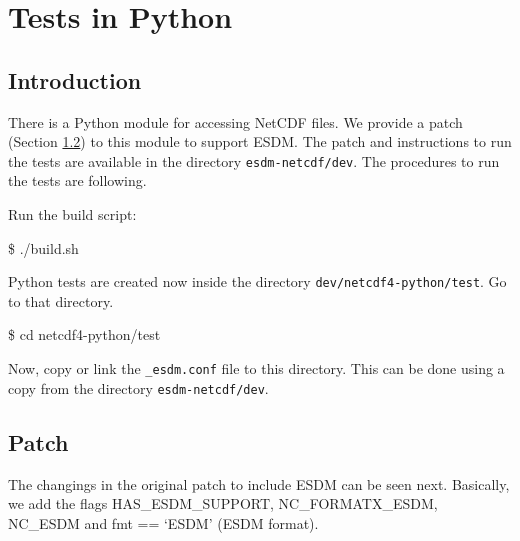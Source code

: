 \chapter{Tests in Python}
\label{ch:python}

\section{Introduction}

There is a Python module for accessing NetCDF files. We provide a patch (Section \ref{sec:patch}) to this module to support ESDM.
The patch and instructions to run the tests are available in the directory \texttt{esdm-netcdf/dev}.
The procedures to run the tests are following.

Run the build script:

\begin{framed}
\$ ./build.sh
\end{framed}

Python tests are created now inside the directory \texttt{dev/netcdf4-python/test}. Go to that directory.

\begin{framed}
\$ cd netcdf4-python/test
\end{framed}

Now, copy or link the \texttt{\_esdm.conf} file to this directory. This can be done using a copy from the directory \texttt{esdm-netcdf/dev}.

\section{Patch}
\label{sec:patch}

The changings in the original patch to include ESDM can be seen next. Basically, we add the flags HAS\_ESDM\_SUPPORT, NC\_FORMATX\_ESDM, NC\_ESDM and fmt == `ESDM' (ESDM format).\\

